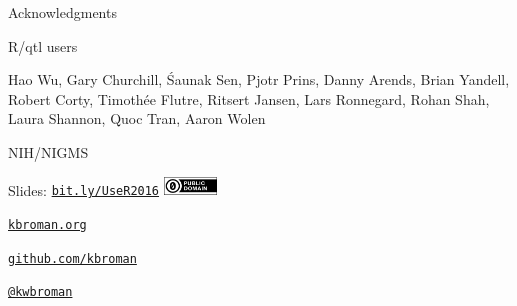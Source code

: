 \documentclass[12pt,t]{beamer}
\begin{document}
\begin{frame}[c]{Acknowledgments}

\bbi

  \item R/qtl users

  \item Hao Wu, Gary Churchill, \'Saunak Sen, Pjotr Prins, Danny
    Arends, Brian Yandell, Robert Corty, Timoth\'ee Flutre, Ritsert
    Jansen, Lars Ronnegard, Rohan Shah, Laura Shannon, Quoc Tran,
    Aaron Wolen

  \item NIH/NIGMS

\ei



\end{frame}




\begin{frame}[c]{}

\Large

Slides: \href{http://bit.ly/UseR2016}{\tt bit.ly/UseR2016} \quad
\includegraphics[height=5mm]{Figs/cc-zero.png}

\vspace{10mm}

\href{http://kbroman.org}{\tt kbroman.org}

\vspace{10mm}

\href{https://github.com/kbroman}{\tt github.com/kbroman}

\vspace{10mm}

\href{https://twitter.com/kwbroman}{\tt @kwbroman}


\end{frame}
\end{document}

